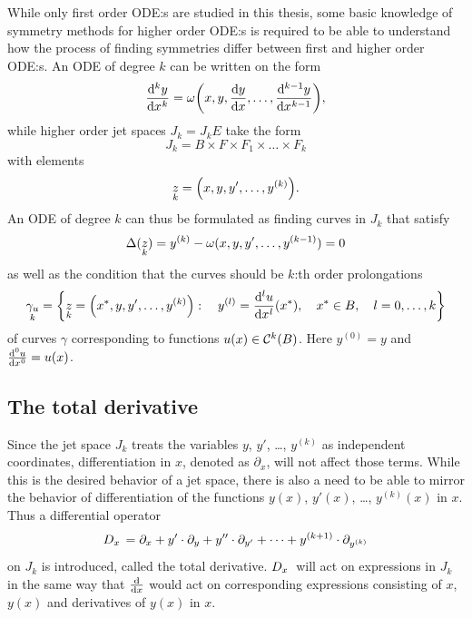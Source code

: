 While only first order ODE:s are studied in this thesis, some basic knowledge of symmetry methods for higher order ODE:s is required to be able to understand how the process of finding symmetries differ between first and higher order ODE:s.
An ODE of degree \(k\) can be written on the form
\begin{equation*}
  \diff[k]{y}{x} = \omega\left(x, y, \diff{y}{x}, \dots, \diff[k-1]{y}{x}\right),
\end{equation*}
while higher order jet spaces \(J_k = J_k E\) take the form
\begin{equation*}
  J_k = B \times F \times F_1 \times \dots \times F_k
\end{equation*}
with elements
\begin{equation*}
  \prolong{z}{k} = \left(x, y, y', \dots, y^{(k)}\right).
\end{equation*}
An ODE of degree \(k\) can thus be formulated as finding curves in \(J_k\) that satisfy
\begin{equation*}
  \Delta(\prolong{z}{k}) = y^{(k)} - \omega(x, y, y', \dots, y^{(k-1)}) = 0
\end{equation*}
as well as the condition that the curves should be \(k\):th order prolongations
\begin{equation*}
  \prolong{\gamma_u}{k} = \left\{\prolong{z}{k} = \left(\fixed{x}, y, y', \dots, y^{(k)}\right):\quad y^{(l)} = \diff[l]{u}{x}{(\fixed{x})},\quad \fixed{x} \in B,\quad l = 0, \dots, k\right\}
\end{equation*}
of curves \(\gamma\) corresponding to functions \(u(x) \in \cont{k}{B}\).
Here \(y^{(0)} = y\) and \(\diff[0]{u}{x} = u(x)\).

\subsection{The total derivative}

Since the jet space \(J_k\) treats the variables \(y\), \(y'\), \dots, \(y^{(k)}\) as independent coordinates, differentiation in \(x\), denoted as \(\partial_x\), will not affect those terms.
While this is the desired behavior of a jet space, there is also a need to be able to mirror the behavior of differentiation of the functions \(y(x)\), \(y'(x)\), \dots, \(y^{(k)}(x)\) in \(x\).
Thus a differential operator
\begin{equation*}
  \tD{x} = \partial_x + y' \cdot \partial_y + y'' \cdot \partial_{y'} + \dots + y^{(k+1)} \cdot \partial_{y^{(k)}}
\end{equation*}
on \(J_k\) is introduced, called the total derivative.
\(\tD{x}\) will act on expressions in \(J_k\) in the same way that \(\diff*{}{x}\) would act on corresponding expressions consisting of \(x\), \(y(x)\) and derivatives of \(y(x)\) in \(x\).

